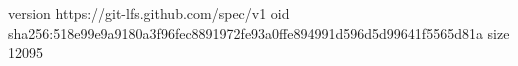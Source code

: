 version https://git-lfs.github.com/spec/v1
oid sha256:518e99e9a9180a3f96fec8891972fe93a0ffe894991d596d5d99641f5565d81a
size 12095
